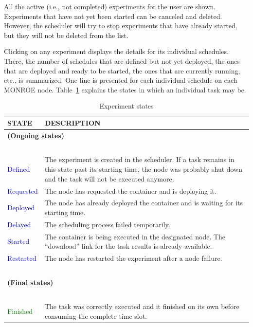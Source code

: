 \documentclass[a4paper,10pt]{article}
\newcommand{\monroe}{MONROE}
\begin{document}
All the active (i.e., not completed) experiments for the user are shown.
Experiments that have not yet been started can be canceled and deleted.
However, the scheduler will try to stop experiments that have already started, but they will not be deleted from the list.

Clicking on any experiment displays the details for its individual schedules.
There, the number of schedules that are defined but not yet deployed, the ones that are deployed and ready to be started, the ones that are currently running, etc., is summarized.
One line is presented for each individual schedule on each \monroe{} node.
Table~\ref{tab:experimentStates} explains the states in which an individual task may be.

\begin{table}[tp]
	\caption{Experiment states}\label{tab:experimentStates}
	\begin{center}
		\begin{tabular*}{1\textwidth}{p{}p{}}
			\toprule
			\textbf{STATE} & \textbf{DESCRIPTION} \\ \midrule
			\multicolumn{2}{l}{\textbf{(Ongoing states)}}\\~\\
			\textcolor{blue}{Defined} & The experiment is created in the scheduler. If a task remains in this state past its starting time, the node was probably shut down and the task will not be executed anymore.\\
			\textcolor{blue}{Requested} & The node has requested the container and is deploying it.\\
			\textcolor{blue}{Deployed} & The node has already deployed the container and is waiting for its starting time.\\
			\textcolor{blue}{Delayed} & The scheduling process failed temporarily.\\
			\textcolor{blue}{Started} & The container is being executed in the designated node. The ``download'' link for the task results is already available.\\
			\textcolor{blue}{Restarted} & The node has restarted the experiment after a node failure.\\~\\
			\midrule
			\multicolumn{2}{l}{\textbf{(Final states)}}\\~\\
			\textcolor{green}{Finished} & The task was correctly executed and it finished on its own before consuming the complete time slot.\\

\end{tabular*}
\end{center}
\end{table}
\end{document}
